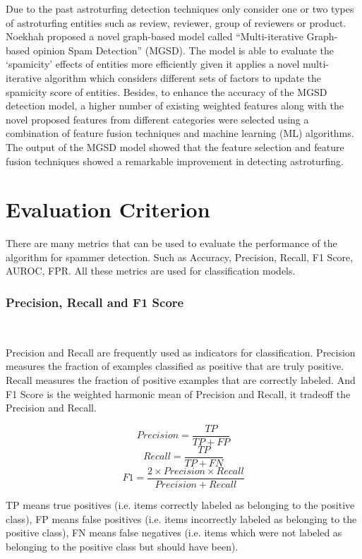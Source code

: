 \documentclass[lettersize,journal]{IEEEtran}
\begin{document}
Due to the past astroturfing detection techniques only consider one or two types of astroturfing entities such as review, reviewer, group of reviewers or product. Noekhah \cite{noekhah2020opinion} proposed a novel graph-based model called “Multi-iterative Graph-based opinion Spam Detection” (MGSD). The model is able to evaluate the ‘spamicity’ effects of entities more efficiently given it applies a novel multi-iterative algorithm which considers different sets of factors to update the spamicity score of entities. Besides, to enhance the accuracy of the MGSD detection model, a higher number of existing weighted features along with the novel proposed features from different categories were selected using a combination of feature fusion techniques and machine learning (ML) algorithms. The output of the MGSD model showed that the feature selection and feature fusion techniques showed a remarkable improvement in detecting astroturfing. 




\section{Evaluation Criterion}
There are many metrics that can be used to evaluate the performance of the algorithm for spammer detection. Such as Accuracy, Precision, Recall, F1 Score, AUROC, FPR. All these metrics are used for classification models. 


\subsubsection{Precision, Recall and F1 Score}
\

Precision and Recall are frequently used as indicators for classification. Precision measures the fraction of examples classified as positive that are truly positive. Recall measures the fraction of positive examples that are correctly labeled. And F1 Score is the weighted harmonic mean of Precision and Recall, it tradeoff the Precision and Recall.

\[Precision = \frac{TP}{TP+FP}\]
\[Recall = \frac{TP}{TP+FN}\]
\[F1 = \frac{2\times Precision \times Recall}{Precision + Recall}\]

TP means true positives (i.e. items correctly labeled as belonging to the positive class), FP means false positives (i.e. items incorrectly labeled as belonging to the positive class), FN means false negatives (i.e. items which were not labeled as belonging to the positive class but should have been).
\end{document}
